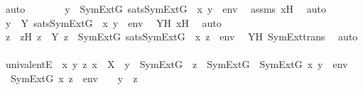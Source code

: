 \begin{isabellebody}
\ auto\isanewline
\isanewline
\ \ \ \ \isamarkupfalse%
\ \isamarkupfalse%
\ {\isachardoublequoteopen}{\isasymexists}y\ {\isasymin}\ SymExt{\isacharparenleft}{\kern0pt}G{\isacharparenright}{\kern0pt}{\isachardot}{\kern0pt}\ sats{\isacharparenleft}{\kern0pt}SymExt{\isacharparenleft}{\kern0pt}G{\isacharparenright}{\kern0pt}{\isacharcomma}{\kern0pt}\ {\isasymphi}{\isacharcomma}{\kern0pt}\ {\isacharbrackleft}{\kern0pt}x{\isacharcomma}{\kern0pt}\ y{\isacharbrackright}{\kern0pt}\ {\isacharat}{\kern0pt}\ env{\isacharparenright}{\kern0pt}{\isachardoublequoteclose}\ \isamarkupfalse%
\ assms{}\ xH\ \isamarkupfalse%
\ auto\isanewline
\ \ \ \ \isamarkupfalse%
\ \isamarkupfalse%
\ {\isachardoublequoteopen}{\isasymexists}y\ {\isasymin}\ Y{\isachardot}{\kern0pt}\ sats{\isacharparenleft}{\kern0pt}SymExt{\isacharparenleft}{\kern0pt}G{\isacharparenright}{\kern0pt}{\isacharcomma}{\kern0pt}\ {\isasymphi}{\isacharcomma}{\kern0pt}\ {\isacharbrackleft}{\kern0pt}x{\isacharcomma}{\kern0pt}\ y{\isacharbrackright}{\kern0pt}\ {\isacharat}{\kern0pt}\ env{\isacharparenright}{\kern0pt}{\isachardoublequoteclose}\ \isamarkupfalse%
\ YH\ xH\ \isamarkupfalse%
\ auto\isanewline
\ \ \ \ \isamarkupfalse%
\ \isamarkupfalse%
\ z\ \ zH{\isacharcolon}{\kern0pt}\ {\isachardoublequoteopen}z\ {\isasymin}\ Y{\isachardoublequoteclose}\ {\isachardoublequoteopen}z\ {\isasymin}\ SymExt{\isacharparenleft}{\kern0pt}G{\isacharparenright}{\kern0pt}{\isachardoublequoteclose}\ {\isachardoublequoteopen}sats{\isacharparenleft}{\kern0pt}SymExt{\isacharparenleft}{\kern0pt}G{\isacharparenright}{\kern0pt}{\isacharcomma}{\kern0pt}\ {\isasymphi}{\isacharcomma}{\kern0pt}\ {\isacharbrackleft}{\kern0pt}x{\isacharcomma}{\kern0pt}\ z{\isacharbrackright}{\kern0pt}\ {\isacharat}{\kern0pt}\ env{\isacharparenright}{\kern0pt}{\isachardoublequoteclose}\ \isamarkupfalse%
\ YH\ SymExt{\isacharunderscore}{\kern0pt}trans\ \isamarkupfalse%
\ auto\isanewline
\isanewline
\ \ \ \ \isamarkupfalse%
\ univalentE\ {\isacharcolon}{\kern0pt}\ {\isachardoublequoteopen}{\isasymAnd}x\ y\ z{\isachardot}{\kern0pt}\ x\ {\isasymin}\ X\ {\isasymLongrightarrow}\ y\ {\isasymin}\ SymExt{\isacharparenleft}{\kern0pt}G{\isacharparenright}{\kern0pt}\ {\isasymLongrightarrow}\ z\ {\isasymin}\ SymExt{\isacharparenleft}{\kern0pt}G{\isacharparenright}{\kern0pt}\ {\isasymLongrightarrow}\ {\isacharparenleft}{\kern0pt}SymExt{\isacharparenleft}{\kern0pt}G{\isacharparenright}{\kern0pt}{\isacharcomma}{\kern0pt}\ {\isacharbrackleft}{\kern0pt}x{\isacharcomma}{\kern0pt}\ y{\isacharbrackright}{\kern0pt}\ {\isacharat}{\kern0pt}\ env\ {\isasymTurnstile}\ {\isasymphi}{\isacharparenright}{\kern0pt}\ {\isasymLongrightarrow}\ {\isacharparenleft}{\kern0pt}SymExt{\isacharparenleft}{\kern0pt}G{\isacharparenright}{\kern0pt}{\isacharcomma}{\kern0pt}\ {\isacharbrackleft}{\kern0pt}x{\isacharcomma}{\kern0pt}\ z{\isacharbrackright}{\kern0pt}\ {\isacharat}{\kern0pt}\ env\ {\isasymTurnstile}\ {\isasymphi}{\isacharparenright}{\kern0pt}\ {\isasymLongrightarrow}\ y\ {\isacharequal}{\kern0pt}\ z{\isachardoublequoteclose}\isanewline

\end{isabellebody}
